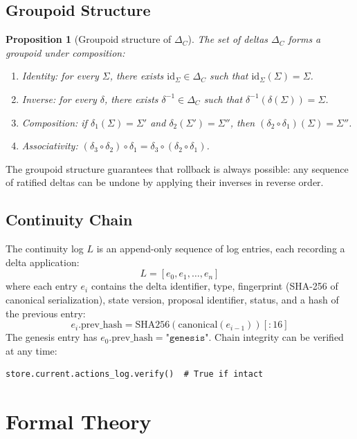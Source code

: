 \documentclass[11pt]{article}
\newtheorem{proposition}[theorem]{Proposition}
\begin{document}
\subsection{Groupoid Structure}

\begin{proposition}[Groupoid structure of $\Delta_C$]
The set of deltas $\Delta_C$ forms a groupoid under composition:
\begin{enumerate}
  \item \emph{Identity}: for every $\Sigma$, there exists
    $\mathrm{id}_\Sigma \in \Delta_C$ such that
    $\mathrm{id}_\Sigma(\Sigma) = \Sigma$.
  \item \emph{Inverse}: for every $\delta$, there exists
    $\delta^{-1} \in \Delta_C$ such that
    $\delta^{-1}(\delta(\Sigma)) = \Sigma$.
  \item \emph{Composition}: if $\delta_1(\Sigma) = \Sigma'$ and
    $\delta_2(\Sigma') = \Sigma''$, then
    $(\delta_2 \circ \delta_1)(\Sigma) = \Sigma''$.
  \item \emph{Associativity}:
    $(\delta_3 \circ \delta_2) \circ \delta_1
     = \delta_3 \circ (\delta_2 \circ \delta_1)$.
\end{enumerate}
\end{proposition}

The groupoid structure guarantees that rollback is always possible:
any sequence of ratified deltas can be undone by applying their
inverses in reverse order.

\subsection{Continuity Chain}

The continuity log $L$ is an append-only sequence of log entries,
each recording a delta application:
\[
  L = [e_0, e_1, \ldots, e_n]
\]
where each entry $e_i$ contains the delta identifier, type,
fingerprint (SHA-256 of canonical serialization), state version,
proposal identifier, status, and a hash of the previous entry:
\[
  e_i.\mathrm{prev\_hash}
  = \mathrm{SHA256}(\mathrm{canonical}(e_{i-1}))[:16]
\]
The genesis entry has $e_0.\mathrm{prev\_hash} = \texttt{"genesis"}$.
Chain integrity can be verified at any time:
\begin{lstlisting}
store.current.actions_log.verify()  # True if intact
\end{lstlisting}

\section{Formal Theory}
\label{sec:theory}
\end{document}

